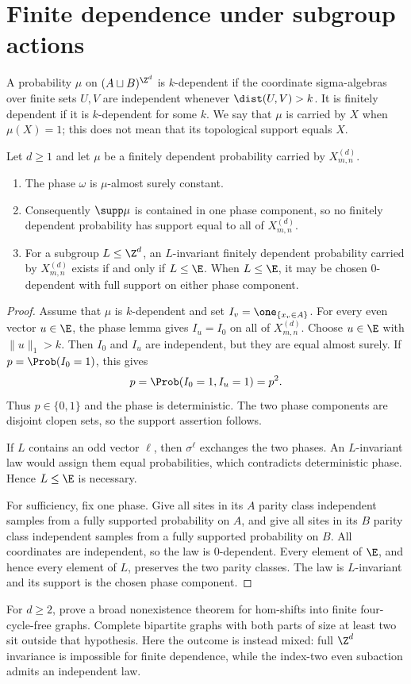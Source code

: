 \section{Finite dependence under subgroup actions}\label{sec:fd}

A probability $\mu$ on $(A\sqcup B)^{\Z^d}$ is $k$-dependent if the
coordinate sigma-algebras over finite sets $U,V$ are independent whenever
$\dist(U,V)>k$.  It is finitely dependent if it is $k$-dependent for some
$k$.  We say that $\mu$ is carried by $X$ when $\mu(X)=1$; this does not mean
that its topological support equals $X$.

\begin{theorem}\label{thm:fd}
Let $d\geq1$ and let $\mu$ be a finitely dependent probability carried by
$X_{m,n}^{(d)}$.
\begin{enumerate}
\item The phase $\omega$ is $\mu$-almost surely constant.
\item Consequently $\supp\mu$ is contained in one phase component, so no
finitely dependent probability has support equal to all of
$X_{m,n}^{(d)}$.
\item For a subgroup $L\leq\Z^d$, an $L$-invariant finitely dependent
probability carried by $X_{m,n}^{(d)}$ exists if and only if $L\leq\E$.
When $L\leq\E$, it may be chosen $0$-dependent with full support on either
phase component.
\end{enumerate}
\end{theorem}

\begin{proof}
Assume that $\mu$ is $k$-dependent and set
$I_v=\one_{\{x_v\in A\}}$.  For every even vector $u\in\E$, the phase lemma
gives $I_u=I_0$ on all of $X_{m,n}^{(d)}$.  Choose $u\in\E$ with
$\lVert u\rVert_1>k$.  Then $I_0$ and $I_u$ are independent, but they are
equal almost surely.  If $p=\Prob(I_0=1)$, this gives
\[
 p=\Prob(I_0=1,I_u=1)=p^2.
\]
Thus $p\in\{0,1\}$ and the phase is deterministic.  The two phase
components are disjoint clopen sets, so the support assertion follows.

If $L$ contains an odd vector $\ell$, then $\sigma^\ell$ exchanges the two
phases.  An $L$-invariant law would assign them equal probabilities, which
contradicts deterministic phase.  Hence $L\leq\E$ is necessary.

For sufficiency, fix one phase.  Give all sites in its $A$ parity class
independent samples from a fully supported probability on $A$, and give all
sites in its $B$ parity class independent samples from a fully supported
probability on $B$.  All coordinates are independent, so the law is
$0$-dependent.  Every element of $\E$, and hence every element of $L$,
preserves the two parity classes.  The law is $L$-invariant and its support
is the chosen phase component.
\end{proof}

For $d\geq2$, \citet{ChandgotiaThorat2026} prove a broad nonexistence theorem
for hom-shifts into finite four-cycle-free graphs.  Complete bipartite graphs
with both parts of size at least two sit outside that hypothesis.  Here the
outcome is instead mixed: full $\Z^d$ invariance is impossible for finite
dependence, while the index-two even subaction admits an independent law.
